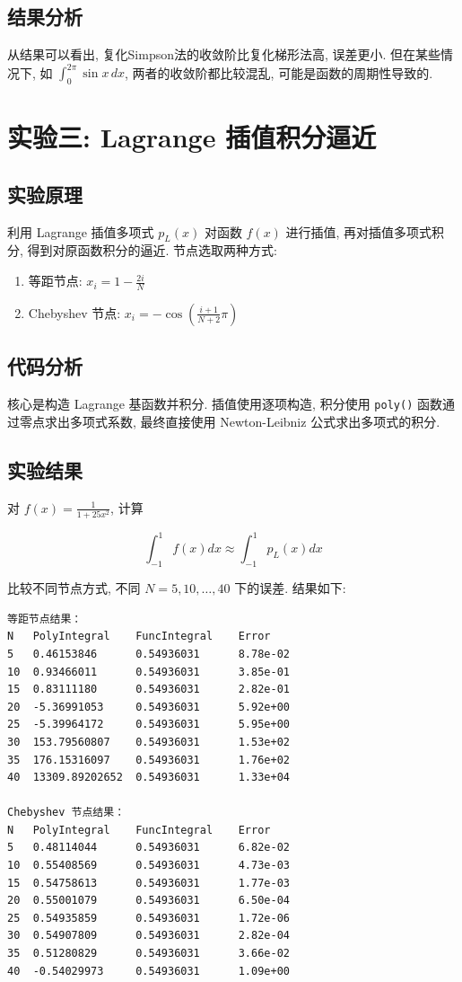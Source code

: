 \documentclass[12pt]{article}
\begin{document}
		\subsection{结果分析}
			从结果可以看出, 复化Simpson法的收敛阶比复化梯形法高, 误差更小. 但在某些情况下, 如 $\int_0^{2\pi} \sin x\,dx$, 两者的收敛阶都比较混乱, 可能是函数的周期性导致的.

	\section{实验三: Lagrange 插值积分逼近}
		\subsection{实验原理}
			利用 Lagrange 插值多项式 $p_L(x)$ 对函数 $f(x)$ 进行插值, 再对插值多项式积分, 得到对原函数积分的逼近. 节点选取两种方式:
			\begin{enumerate}
				\item 等距节点: $x_{i} = 1 - \frac{2i}{N}$
				\item Chebyshev 节点: $x_{i} = -\cos\left(\frac{i + 1}{N + 2}\pi\right)$
			\end{enumerate}

		\subsection{代码分析}
			核心是构造 Lagrange 基函数并积分. 插值使用逐项构造, 积分使用 \texttt{poly()} 函数通过零点求出多项式系数, 最终直接使用 Newton-Leibniz 公式求出多项式的积分.

		\subsection{实验结果}
			对 $f(x) = \frac{1}{1 + 25x^2}$, 计算

			\begin{equation*}
				\int_{-1}^{1} f(x) dx \approx \int_{-1}^{1} p_L(x) dx
			\end{equation*}

			比较不同节点方式, 不同 $N=5,10,\dots,40$ 下的误差. 结果如下:
\begin{lstlisting}
等距节点结果：
N	PolyIntegral	FuncIntegral	Error
5	0.46153846		0.54936031		8.78e-02
10	0.93466011		0.54936031		3.85e-01
15	0.83111180		0.54936031		2.82e-01
20	-5.36991053		0.54936031		5.92e+00
25	-5.39964172		0.54936031		5.95e+00
30	153.79560807	0.54936031		1.53e+02
35	176.15316097	0.54936031		1.76e+02
40	13309.89202652	0.54936031		1.33e+04
	
Chebyshev 节点结果：
N	PolyIntegral	FuncIntegral	Error
5	0.48114044		0.54936031		6.82e-02
10	0.55408569		0.54936031		4.73e-03
15	0.54758613		0.54936031		1.77e-03
20	0.55001079		0.54936031		6.50e-04
25	0.54935859		0.54936031		1.72e-06
30	0.54907809		0.54936031		2.82e-04
35	0.51280829		0.54936031		3.66e-02
40	-0.54029973		0.54936031		1.09e+00
\end{lstlisting}
\end{document}
